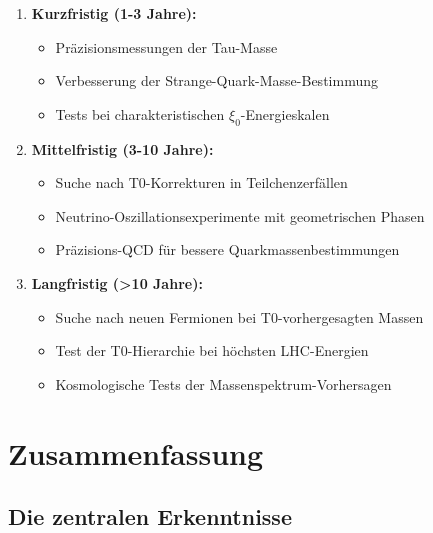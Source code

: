 \documentclass[12pt,a4paper]{article}
\begin{document}
	\begin{enumerate}
		\item \textbf{Kurzfristig (1-3 Jahre):}
		\begin{itemize}
			\item Präzisionsmessungen der Tau-Masse
			\item Verbesserung der Strange-Quark-Masse-Bestimmung
			\item Tests bei charakteristischen $\xi_0$-Energieskalen
		\end{itemize}
		
		\item \textbf{Mittelfristig (3-10 Jahre):}
		\begin{itemize}
			\item Suche nach T0-Korrekturen in Teilchenzerfällen
			\item Neutrino-Oszillationsexperimente mit geometrischen Phasen
			\item Präzisions-QCD für bessere Quarkmassenbestimmungen
		\end{itemize}
		
		\item \textbf{Langfristig (>10 Jahre):}
		\begin{itemize}
			\item Suche nach neuen Fermionen bei T0-vorhergesagten Massen
			\item Test der T0-Hierarchie bei höchsten LHC-Energien
			\item Kosmologische Tests der Massenspektrum-Vorhersagen
		\end{itemize}
	\end{enumerate}
	
	\section{Zusammenfassung}
	
	\subsection{Die zentralen Erkenntnisse}
	
\end{document}
